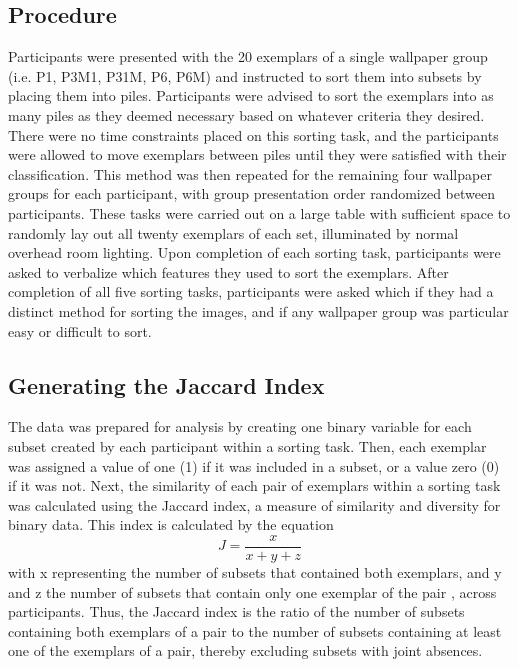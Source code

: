 \documentclass[11pt, twoside]{article}
\begin{document}
\subsection*{Procedure}
Participants were presented with the 20 exemplars of a single wallpaper group (i.e. P1, P3M1, P31M, P6, P6M) and instructed to sort them into subsets by placing them into piles. Participants were advised to sort the exemplars into as many piles as they deemed necessary based on whatever criteria they desired. There were no time constraints placed on this sorting task, and the participants were allowed to move exemplars between piles until they were satisfied with their classification. This method was then repeated for the remaining four wallpaper groups for each participant, with group presentation order randomized between participants. These tasks were carried out on a large table with sufficient space to randomly lay out all twenty exemplars of each set, illuminated by normal overhead room lighting. Upon completion of each sorting task, participants were asked to verbalize which features they used to sort the exemplars. After completion of all five sorting tasks, participants were asked which if they had a distinct method for sorting the images, and if any wallpaper group was particular easy or difficult to sort.

\subsection*{Generating the Jaccard Index}
The data was prepared for analysis by creating one binary variable for each subset created by each participant within a sorting task. Then, each exemplar was assigned a value of one (1) if it was included in a subset, or a value zero (0) if it was not. Next, the similarity of each pair of exemplars within a sorting task was calculated using the Jaccard index, a measure of similarity and diversity for binary data. This index is calculated by the equation  \[ J = \frac{x}{x + y + z} \] with x representing the number of subsets that contained both exemplars, and y and z the number of subsets that contain only one exemplar of the pair \citep{capra_factor_2005}, across participants. Thus, the Jaccard index is the ratio of the number of subsets containing both exemplars of a pair to the number of subsets containing at least one of the exemplars of a pair, thereby excluding subsets with joint absences.
\end{document}
